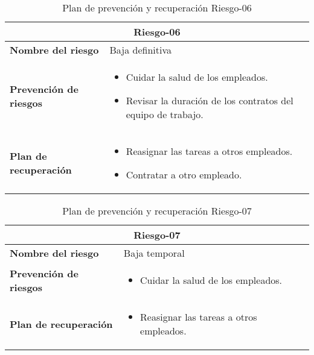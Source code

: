 \begin{table}[H]
\begin{center}
\begin{tabular}{p{} p{10cm}}
\multicolumn{2}{c}{\textbf{Riesgo-06} } \\
\hline \hline
\textbf{Nombre del riesgo} & Baja definitiva \\
\hline
\textbf{Prevención de riesgos} & \begin{itemize}[-]
  \item Cuidar la salud de los empleados.
  \item Revisar la duración de los contratos del equipo de trabajo.
  \end{itemize} \\
\hline
\textbf{Plan de recuperación} &   \begin{itemize}[-]
  \item Reasignar las tareas a otros empleados.
  \item Contratar a otro empleado.
  \end{itemize}\\
\hline
\end{tabular}
\caption{Plan de prevención y recuperación Riesgo-06}
\label{tab:Riesgo-06-Prev_Recup}
\end{center}
\end{table}


\begin{table}[H]
\begin{center}
\begin{tabular}{p{} p{10cm}}
\multicolumn{2}{c}{\textbf{Riesgo-07} } \\
\hline \hline
\textbf{Nombre del riesgo} & Baja temporal \\
\hline
\textbf{Prevención de riesgos} & \begin{itemize}[-]
  \item Cuidar la salud de los empleados.
  \end{itemize} \\
\hline
\textbf{Plan de recuperación} &   \begin{itemize}[-]
  \item Reasignar las tareas a otros empleados.
  \end{itemize}\\
\hline
\end{tabular}
\caption{Plan de prevención y recuperación Riesgo-07}
\label{tab:Riesgo-07-Prev_Recup}
\end{center}
\end{table}




